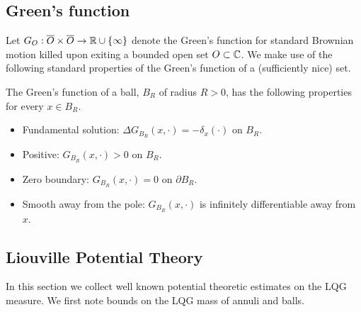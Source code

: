 \documentclass[12pt]{amsart}
\numberwithin{equation}{section}
\begin{document}
	
	
	\subsection{Green's function} \label{subsec:green}
	Let $G_{O}:\overline{O} \times \overline{O} \to \mathbb{R} \cup \{\infty\}$ denote the Green's function for standard Brownian motion killed upon exiting a bounded open set $O \subset \mathbb{C}$. 
	We make use of the following standard properties of the Green's function of a (sufficiently nice) set. 
	\begin{prop} \label{prop:green-properties}
		The Green's function of a ball, $B_R$ of radius $R > 0$, has the following properties for every $x \in B_R$.
		\begin{itemize}
			\item Fundamental solution: $\Delta G_{B_R}(x,\cdot) = -\delta_x(\cdot)$ on $B_R$.
			\item Positive: $G_{B_R}(x, \cdot) > 0$ on $B_R$.
			\item Zero boundary: $G_{B_R}(x, \cdot) = 0$ on $\partial B_R$.
			\item Smooth away from the pole: $G_{B_R}(x, \cdot)$ is infinitely differentiable away from $x$. 
		\end{itemize}
	\end{prop}
	
	
	\subsection{Liouville Potential Theory} \label{subsec:lqg-appendix}
	
	In this section we collect well known potential theoretic estimates on the LQG measure. 
	We first note bounds on the LQG mass of annuli and balls.   
	
\end{document}
